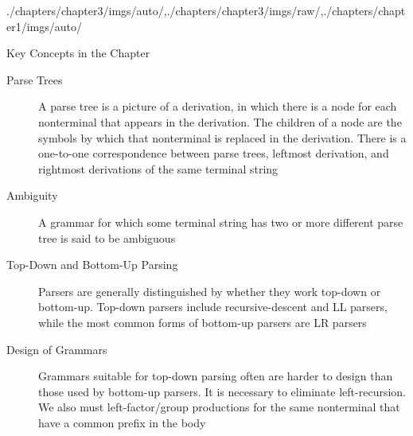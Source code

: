 \begin{graphicspathcontext}{{./chapters/chapter3/imgs/auto/},{./chapters/chapter3/imgs/raw/},{./chapters/chapter1/imgs/auto/}}
\begin{bibunit}[apalike]
\begin{frame}{{Key Concepts} in the Chapter \insertcontinuationtext}
	\begin{small}
	\begin{description}
	\item[Parse Trees] A parse tree is a picture of a derivation, in which there is a node for each nonterminal that appears in the derivation. The children of a node are the symbols by which that nonterminal is replaced in the derivation. There is a one-to-one correspondence between parse trees, leftmost derivation, and rightmost derivations of the same terminal string
	\item[Ambiguity] A grammar for which some terminal string has two or more different parse tree is said to be ambiguous
	\item[Top-Down and Bottom-Up Parsing] Parsers are generally distinguished by whether they work top-down or bottom-up. Top-down parsers include recursive-descent and LL parsers, while the most common forms of bottom-up parsers are LR parsers
	\item[Design of Grammars] Grammars suitable for top-down parsing often are harder to design than those used by bottom-up parsers. It is necessary to eliminate left-recursion. We also must left-factor/group productions for the same nonterminal that have a common prefix in the body
	\end{description}
\end{small}
\end{frame}


\end{bibunit}
\end{graphicspathcontext}

